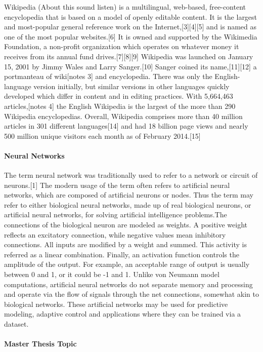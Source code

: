 \documentclass[a4paper, 11pt]{article}
\begin{document}
Wikipedia (About this sound listen) is a multilingual, web-based, free-content encyclopedia that is based on a model of openly editable content. It is the largest and most-popular general reference work on the Internet,[3][4][5] and is named as one of the most popular websites.[6] It is owned and supported by the Wikimedia Foundation, a non-profit organization which operates on whatever money it receives from its annual fund drives.[7][8][9]
Wikipedia was launched on January 15, 2001 by Jimmy Wales and Larry Sanger.[10] Sanger coined its name,[11][12] a portmanteau of wiki[notes 3] and encyclopedia. There was only the English-language version initially, but similar versions in other languages quickly developed which differ in content and in editing practices. With 5,664,463 articles,[notes 4] the English Wikipedia is the largest of the more than 290 Wikipedia encyclopedias. Overall, Wikipedia comprises more than 40 million articles in 301 different languages[14] and had 18 billion page views and nearly 500 million unique visitors each month as of February 2014.[15]

\paragraph{Neural Networks}\mbox{}

The term neural network was traditionally used to refer to a network or circuit of neurons.[1] The modern usage of the term often refers to artificial neural networks, which are composed of artificial neurons or nodes. Thus the term may refer to either biological neural networks, made up of real biological neurons, or artificial neural networks, for solving artificial intelligence problems.The connections of the biological neuron are modeled as weights. A positive weight reflects an excitatory connection, while negative values mean inhibitory connections. All inputs are modified by a weight and summed. This activity is referred as a linear combination. Finally, an activation function controls the amplitude of the output. For example, an acceptable range of output is usually between 0 and 1, or it could be -1 and 1.
Unlike von Neumann model computations, artificial neural networks do not separate memory and processing and operate via the flow of signals through the net connections, somewhat akin to biological networks.
These artificial networks may be used for predictive modeling, adaptive control and applications where they can be trained via a dataset.


\paragraph{Master Thesis Topic}\mbox{}
\end{document}
